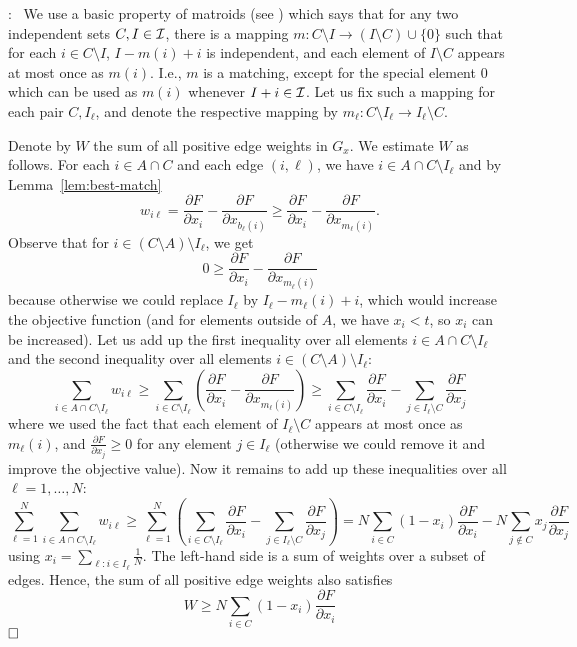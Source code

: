 \documentclass{article}[11pt]
\newcommand{\partdiff}[2]{\frac{\partial {#1}}{\partial {#2}}}
\renewenvironment{proof}{\noindent{\bf Proof}:~}{$\hfill \Box$\\}
\def\cI{{\cal I}}
\begin{document}
\begin{proof}
We use a basic property of matroids (see \cite{Schrijver}) which says
that for any two independent sets $C, I \in \cI$, there is a
mapping $m:C \setminus I \rightarrow (I \setminus C) \cup \{0\}$ such that
for each $i \in C \setminus I$, $I - m(i) + i$ is independent,
and each element of $I \setminus C$ appears at most once as $m(i)$.
I.e., $m$ is a matching, except for the special element $0$ which can be used
as $m(i)$ whenever $I+i \in \cI$.
Let us fix such a mapping for each pair $C,I_\ell$, and denote the respective
mapping by $m_\ell:C \setminus I_\ell \rightarrow I_\ell \setminus C$.

Denote by $W$ the sum of all positive edge weights in $G_x$. We estimate
$W$ as follows. For each $i \in A \cap C$ and each edge $(i,\ell)$, we have
$i \in A \cap C \setminus I_\ell$ and by Lemma~\ref{lem:best-match}
$$ w_{i\ell} = \partdiff{F}{x_i} - \partdiff{F}{x_{b_\ell(i)}}
 \geq \partdiff{F}{x_i} - \partdiff{F}{x_{m_\ell(i)}}. $$
Observe that for $i \in (C \setminus A) \setminus I_\ell$, we get
$$ 0 \geq \partdiff{F}{x_i} - \partdiff{F}{x_{m_\ell(i)}} $$
because otherwise we could replace $I_\ell$ by $I_\ell-m_\ell(i)+i$,
which would increase the objective function (and for elements outside of $A$,
we have $x_i < t$, so $x_i$ can be increased).
Let us add up the first inequality over all elements $i \in A \cap C \setminus I_\ell$
and the second inequality over all elements $i \in (C \setminus A) \setminus I_\ell$:
$$ \sum_{i \in A \cap C \setminus I_\ell} w_{i\ell} \geq
 \sum_{i \in C \setminus I_\ell} \left( \partdiff{F}{x_i}
  - \partdiff{F}{x_{m_\ell(i)}} \right) 
  \geq \sum_{i \in C \setminus I_\ell} \partdiff{F}{x_i}
   - \sum_{j \in I_\ell \setminus C} \partdiff{F}{x_j}  $$
where we used the fact that each element of $I_\ell \setminus C$
appears at most once as $m_\ell(i)$, and $\partdiff{F}{x_j} \geq 0$
for any element $j \in I_\ell$ (otherwise we could remove it
and improve the objective value).
Now it remains to add up these inequalities over all $\ell=1,\ldots,N$:
$$ \sum_{\ell=1}^{N} \sum_{i \in A \cap C \setminus I_\ell} w_{i \ell}
 \geq \sum_{\ell=1}^{N} \left(  \sum_{i \in C \setminus I_\ell} \partdiff{F}{x_i}
   - \sum_{j \in I_\ell \setminus C} \partdiff{F}{x_j} \right)
    = N \sum_{i \in C} (1-x_i) \partdiff{F}{x_i}
    - N \sum_{j \notin C} x_j \partdiff{F}{x_j} $$
using $x_i = \sum_{\ell: i \in I_\ell} \frac{1}{N}$.
The left-hand side is a sum of weights over a subset of edges.
Hence, the sum of all positive edge weights also satisfies
$$ W \geq N \sum_{i \in C} (1-x_i) \partdiff{F}{x_i}
$$
\end{proof}
\end{document}
